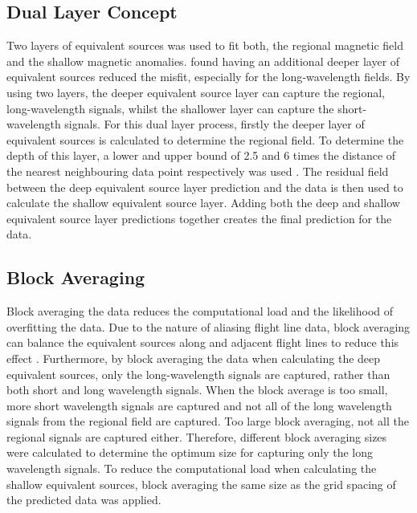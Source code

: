 \subsection{Dual Layer Concept}
Two layers of equivalent sources was used to fit both, the regional magnetic field and the shallow magnetic anomalies. \cite{Li2019} found having an additional deeper layer of equivalent sources reduced the misfit, especially for the long‐wavelength fields. By using two layers, the deeper equivalent source layer can capture the regional, long-wavelength signals, whilst the shallower layer can capture the short-wavelength signals. For this dual layer process, firstly the deeper layer of equivalent sources is calculated to determine the regional field. To determine the depth of this layer, a lower and upper bound of 2.5 and 6 times the distance of the nearest neighbouring data point respectively was used \cite{Dampney1969}. The residual field between the deep equivalent source layer prediction and the data is then used to calculate the shallow equivalent source layer. Adding both the deep and shallow equivalent source layer predictions together creates the final prediction for the data.

\subsection{Block Averaging}
Block averaging the data reduces the computational load and the likelihood of overfitting the data. Due to the nature of aliasing flight line data, block averaging can balance the equivalent sources along and adjacent flight lines to reduce this effect \cite{SolerUieda2021}. Furthermore, by block averaging the data when calculating the deep equivalent sources, only the long-wavelength signals are captured, rather than both short and long wavelength signals. When the block average is too small, more short wavelength signals are captured and not all of the long wavelength signals from the regional field are captured. Too large block averaging, not all the regional signals are captured either. Therefore, different block averaging sizes were calculated to determine the optimum size for capturing only the long wavelength signals. To reduce the computational load when calculating the shallow equivalent sources, block averaging the same size as the grid spacing of the predicted data was applied.

